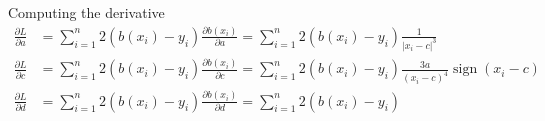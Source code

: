 Computing the derivative 
\begin{align*}
\frac{\partial L}{\partial a}
&=
\sum_{i=1}^n 2(b(x_i)-y_i) \frac{\partial b(x_i)}{\partial a}
=
\sum_{i=1}^n 2(b(x_i)-y_i)\frac{1}{|x_i-c|^3}
\\
\frac{\partial L}{\partial c}
&=
\sum_{i=1}^n 2(b(x_i)-y_i) \frac{\partial b(x_i)}{\partial c}
=
\sum_{i=1}^n 2(b(x_i)-y_i) \frac{3a}{(x_i-c)^4}\operatorname{sign}(x_i-c)
\\
\frac{\partial L}{\partial d}
&=
\sum_{i=1}^n 2(b(x_i)-y_i) \frac{\partial b(x_i)}{\partial d}
=
\sum_{i=1}^n 2(b(x_i)-y_i)
\end{align*}



